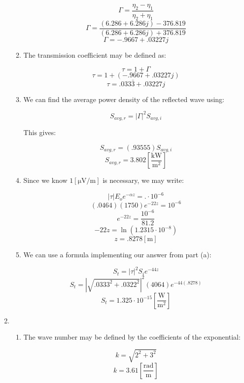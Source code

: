 \begin{enumerate}
\begin{enumerate}
        $$\Gamma=\frac{\eta_2-\eta_1}{\eta_2+\eta_1}$$
        $$\Gamma=\frac{(6.286+6.286j)-376.819}{(6.286+6.286j)+376.819}$$
        $$\boxed{\Gamma=-.9667+.03227j}$$

      \item 

        The transmission coefficient may be defined as:

        $$\tau=1+\Gamma$$
        $$\tau=1+(-.9667+.03227j)$$
        $$\boxed{\tau=.033\bar{3}+.03227j}$$

      \item 

        We can find the average power density of the reflected wave using:

        $$S_{avg,r}=|\Gamma|^2S_{avg,i}$$

        This gives:

        $$S_{avg,r}=(.93555)S_{avg,i}$$
        $$\boxed{S_{avg,r}=3.802\left[ \frac{\si{\kilo\watt}}{\si{\meter\squared}} \right]}$$


      \item 

        Since we know $1[\si{\micro\volt\per\meter}]$ is necessary, we may write:

        $$|\tau|E_oe^{-\alpha z}=.\cdot10^{-6}$$
        $$(.0464)(1750)e^{-22 z}=10^{-6}$$
        $$e^{-22 z}=\frac{10^{-6}}{81.2}$$
        $$-22 z=\ln(1.2315\cdot10^{-8})$$
        $$\boxed{z=.8278[\si{\meter}]}$$

      \item 

        We can use a formula implementing our answer from part (a):

        $$S_{t}=|\tau|^2S_ie^{-44z}$$
        $$S_{t}=|\sqrt{.0333^2+.0322^2}|^2(4064)e^{-44(.8278)}$$
        $$S_{t}=1.325\cdot10^{-15}\left[ \frac{\si{\watt}}{\si{\meter\squared}} \right]$$

    \end{enumerate}

  \item

    \begin{enumerate}

      \item 

        The wave number may be defined by the coefficients of the exponential:

        $$k=\sqrt{2^2+3^2}$$
        $$k=3.61\left[ \frac{\text{rad}}{\si{\meter}} \right]$$


\end{enumerate}
\end{enumerate}
